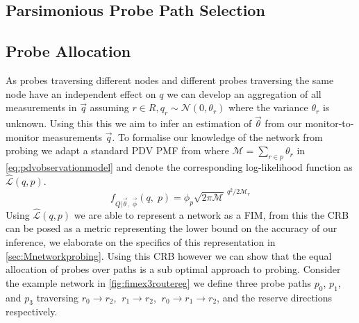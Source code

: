 \subsection{Parsimonious Probe Path Selection}
\label{ssec:Mpppselection}

\subsection{Probe Allocation}
\label{ssec:Mpallocation}

As probes traversing different nodes and different probes traversing the same node have an independent effect on $q$ we can develop an aggregation of all measurements in $\vec{q}$ assuming $r\in R, q_r \sim \mathcal{N}(0, \theta_r)$ where the variance $\theta_r$ is unknown. Using this this we aim to infer an estimation of $\vec{\theta}$ from our monitor-to-monitor measurements $\vec{q}$. To formalise our knowledge of the network from probing we adapt a standard PDV PMF from \cite{he_network_2021} where $\mathcal{M} = \sum_{r\in p}\theta_r$ in \cref{eq:pdvobservationmodel} and denote the corresponding log-likelihood function as $\widehat{\mathcal{L}}(q, p)$.
\begin{equation}
\label{eq:pdvobservationmodel}
    f_{Q|\vec{\theta},\; \vec{\phi}}(q,\;p) = \phi_p \sqrt{2\pi\mathcal{M}}^{\ q^2/{2\mathcal{M}_r}}
\end{equation}
Using $\widehat{\mathcal{L}}(q, p)$ we are able to represent a network as a FIM, from this the CRB can be posed as a metric representing the lower bound on the accuracy of our inference, we elaborate on the specifics of this representation in \cref{sec:Mnetworkprobing}. Using this CRB however we can show that the equal allocation of probes over paths is a sub optimal approach to probing. Consider the example network in \cref{fig:fimex3routereg} we define three probe paths $p_0$, $p_1$, and $p_3$ traversing $r_0\rightarrow r_2$, $\ r_1\rightarrow r_2$, $\ r_0\rightarrow r_1\rightarrow r_2$, and the reserve directions respectively.
